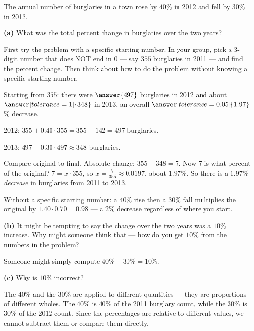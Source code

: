 \documentclass[12pt]{ximera}
\begin{document}
\begin{problem}
The annual number of burglaries in a town rose by $40\%$ in 2012 and fell by $30\%$
in 2013.

\begin{prompt}
\textbf{(a)} What was the total percent change in burglaries over the two years?

First try the problem with a specific starting number. In your group, pick a 3-digit
number that does NOT end in $0$ --- say $355$ burglaries in 2011 --- and find the
percent change. Then think about how to do the problem without knowing a specific
starting number.

Starting from $355$: there were $\answer{497}$ burglaries in 2012 and about
$\answer[tolerance=1]{348}$ in 2013, an overall
$\answer[tolerance=0.05]{1.97}$\% decrease.

\begin{solution}
2012: $355 + 0.40 \cdot 355 = 355 + 142 = 497$ burglaries.

2013: $497 - 0.30 \cdot 497 \approx 348$ burglaries.

Compare original to final. Absolute change: $355 - 348 = 7$. Now $7$ is what percent
of the original? $7 = x \cdot 355$, so $x = \frac{7}{355} \approx 0.0197$, about
$1.97\%$. So there is a $1.97\%$ \emph{decrease} in burglaries from 2011 to 2013.

Without a specific starting number: a $40\%$ rise then a $30\%$ fall multiplies the
original by $1.40 \cdot 0.70 = 0.98$ --- a $2\%$ decrease regardless of where you
start.
\end{solution}
\end{prompt}

\begin{prompt}
\textbf{(b)} It might be tempting to say the change over the two years was a $10\%$
increase. Why might someone think that --- how do you get $10\%$ from the numbers in
the problem?
\begin{freeResponse}
\end{freeResponse}

\begin{solution}
Someone might simply compute $40\% - 30\% = 10\%$.
\end{solution}
\end{prompt}

\begin{prompt}
\textbf{(c)} Why is $10\%$ incorrect?
\begin{freeResponse}
\end{freeResponse}

\begin{solution}
The $40\%$ and the $30\%$ are applied to different quantities --- they are
proportions of different wholes. The $40\%$ is $40\%$ of the 2011 burglary count,
while the $30\%$ is $30\%$ of the 2012 count. Since the percentages are relative to
different values, we cannot subtract them or compare them directly.
\end{solution}
\end{prompt}
\end{problem}
\end{document}

